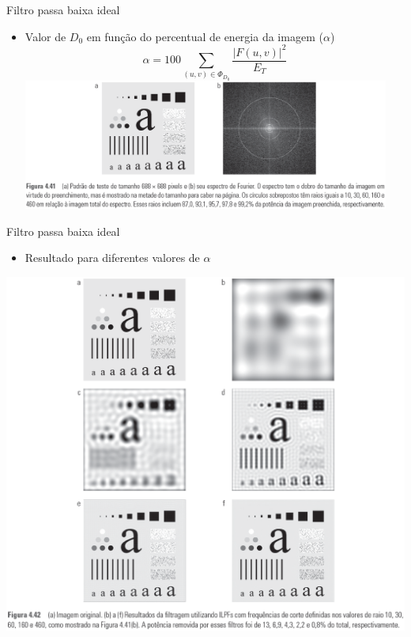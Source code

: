       \begin{slide}[toc=]{Filtro passa baixa ideal}
         \begin{itemize}[type=1]
            \item Valor de $D_0$ em função do percentual de energia da imagem ($\alpha$)
            \begin{equation*}
               \alpha = 100 \sum_{(u,v)\in \Phi_{D_0}}{\frac{|F(u,v)|^2}{E_T}}
            \end{equation*}
            \includegraphics[width=0.95\textwidth]{figs/fig0441}
         \end{itemize}
      \end{slide}
      
      \begin{slide}[toc=]{Filtro passa baixa ideal}
         \begin{itemize}[type=1]
            \item Resultado para diferentes valores de $\alpha$
         \end{itemize}
	      \begin{center}
            \includegraphics[height=0.7\textheight]{figs/fig0442}
	      \end{center}
      \end{slide}
      
